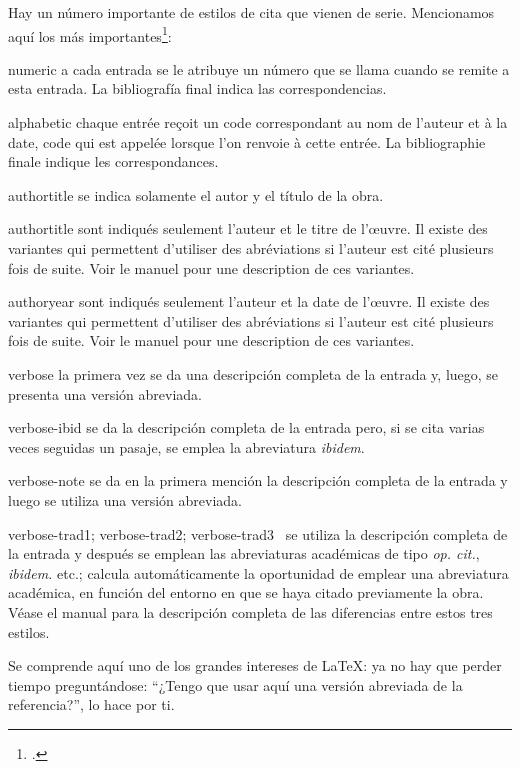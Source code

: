 Hay un número importante de estilos de cita que vienen de
serie. Mencionamos aquí los más importantes\footcite[Para más
detalles, véase][]{biblatex_style}:
\begin{choix}
\item[numeric]a cada entrada se le atribuye un número que se llama
  cuando se remite a esta entrada. La bibliografía final indica las correspondencias.
\item[alphabetic]chaque entrée reçoit un code correspondant au nom de l'auteur et à la date, code qui est appelée lorsque l'on renvoie à cette entrée. La bibliographie finale indique les correspondances.%
\item[authortitle]se indica solamente el autor y el título de la obra.
\item[authortitle]sont indiqués seulement l'auteur et le titre de l'œuvre. Il existe des variantes qui permettent d'utiliser des abréviations si l'auteur est cité plusieurs fois de suite. Voir le manuel pour une description de ces variantes.%
\item[authoryear]sont indiqués seulement l'auteur et la date de l'œuvre. Il existe des variantes qui permettent d'utiliser des abréviations si l'auteur est cité plusieurs fois de suite. Voir le manuel pour une description de ces variantes.%
\item[verbose]la primera vez se da una descripción completa de la
  entrada y, luego, se presenta una versión abreviada.
\item[verbose-ibid]se da la descripción completa de la entrada pero,
  si se cita varias veces seguidas un pasaje, se emplea la abreviatura \emph{ibidem}.
\item[verbose-note]se da en la primera mención la descripción completa
  de la entrada y luego se utiliza una versión abreviada.
\item[verbose-trad1; verbose-trad2; verbose-trad3]~se utiliza la
  descripción completa de la entrada y después se emplean las abreviaturas
  académicas de tipo \emph{op. cit.}, \emph{ibidem.} etc.;
   calcula automáticamente la oportunidad de emplear
  una abreviatura académica, en función del entorno en que se haya
  citado previamente la obra. Véase el manual para la descripción
  completa de las diferencias entre estos tres estilos.
\end{choix}

Se comprende aquí uno de los grandes intereses de \LaTeX{}: ya no hay
que perder tiempo preguntándose: \enquote{¿Tengo que usar aquí una
  versión abreviada de la referencia?},  lo hace por
ti.

